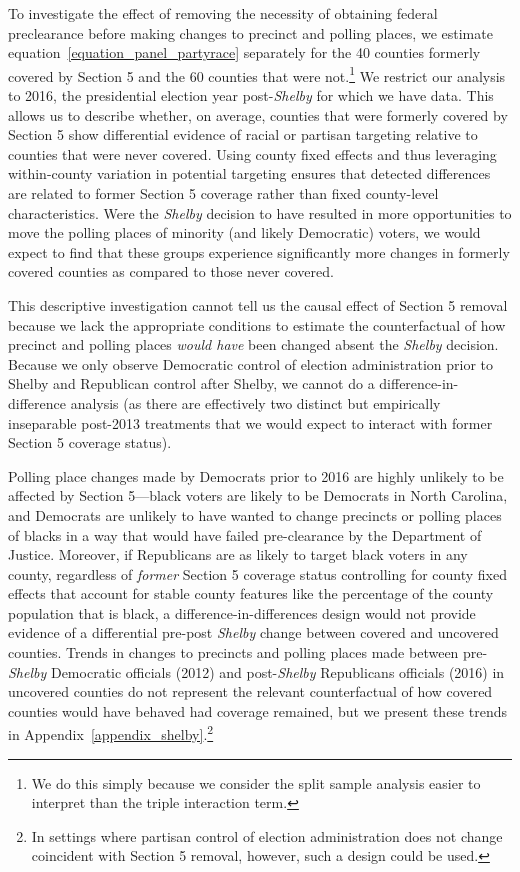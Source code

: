 \documentclass[12pt]{article}
\begin{document}
To investigate the effect of removing the necessity of obtaining federal preclearance before making changes to precinct and polling places, we estimate equation~\ref{equation_panel_partyrace} separately for the 40 counties formerly covered by Section 5 and the 60 counties that were not.\footnote{We do this simply because we consider the split sample analysis easier to interpret than the triple interaction term.}  We restrict our analysis to 2016, the presidential election year post-\emph{Shelby} for which we have data.  This allows us to describe whether, on average, counties that were formerly covered by Section 5 show differential evidence of racial or partisan targeting relative to counties that were never covered.  Using county fixed effects and thus leveraging within-county variation in potential targeting ensures that detected differences are related to former Section 5 coverage rather than fixed county-level characteristics.  Were the \emph{Shelby} decision to have resulted in more opportunities to move the polling places of minority (and likely Democratic) voters, we would expect to find that these groups experience significantly more changes in formerly covered counties as compared to those never covered.

This descriptive investigation cannot tell us the causal effect of Section 5 removal because we lack the appropriate conditions to estimate the counterfactual of how precinct and polling places \emph{would have} been changed absent the \emph{Shelby} decision.  Because we only observe Democratic control of election administration prior to Shelby and Republican control after Shelby, we cannot do a difference-in-difference analysis (as there are effectively two distinct but empirically inseparable post-2013 treatments that we would expect to interact with former Section 5 coverage status).

Polling place changes made by Democrats prior to 2016 are highly unlikely to be affected by Section 5---black voters are likely to be Democrats in North Carolina, and Democrats are unlikely to have wanted to change precincts or polling places of blacks in a way that would have failed pre-clearance by the Department of Justice.  Moreover, if Republicans are as likely to target black voters in any county, regardless of \emph{former} Section 5 coverage status controlling for county fixed effects that account for stable county features like the percentage of the county population that is black, a difference-in-differences design would not provide evidence of a differential pre-post \emph{Shelby} change between covered and uncovered counties.  Trends in changes to precincts and polling places made between pre-\emph{Shelby} Democratic officials (2012) and post-\emph{Shelby} Republicans officials (2016) in uncovered counties do not represent the relevant counterfactual of how covered counties would have behaved had coverage remained, but we present these trends in Appendix~\ref{appendix_shelby}.\footnote{In settings where partisan control of election administration does not change coincident with Section 5 removal, however, such a design could be used.}
\end{document}
